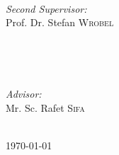 \begin{titlepage}
\begin{minipage}{0.3\textwidth}
  \begin{flushleft} \large
  \end{flushleft}
\end{minipage}
~
\begin{minipage}{0.6\textwidth}
  \begin{flushright} \large
  \emph{Second Supervisor:} \\
  Prof. Dr. Stefan \textsc{Wrobel} %

  \end{flushright}
\end{minipage}\\[0.5cm]

\begin{minipage}{0.3\textwidth}
  \begin{flushleft} \large
  \end{flushleft}
\end{minipage}
~
\begin{minipage}{0.6\textwidth}
  \begin{flushright} \large
  \emph{Advisor:} \\
  Mr. Sc. Rafet \textsc{Sifa} %

  \end{flushright}
\end{minipage}\\[7cm]



{\large \today}\\[3cm] %




\vfill %

\end{titlepage}
